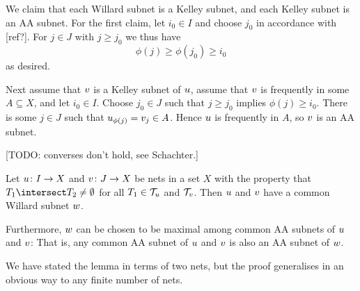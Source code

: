 \documentclass[article, a4paper, 11pt, oneside]{memoir}
\numberwithin{equation}{chapter}
\theoremstyle{nonumberplain}
\begin{document}
\begin{remarkbreak}
    We claim that each Willard subnet is a Kelley subnet, and each Kelley subnet is an AA subnet. For the first claim, let $i_0 \in I$ and choose $j_0$ in accordance with [ref?]. For $j \in J$ with $j \geq j_0$ we thus have
    \begin{equation*}
        \phi(j)
            \geq \phi(j_0)
            \geq i_0
    \end{equation*}
    as desired.

    Next assume that $v$ is a Kelley subnet of $u$, assume that $v$ is frequently in some $A \subseteq X$, and let $i_0 \in I$. Choose $j_0 \in J$ such that $j \geq j_0$ implies $\phi(j) \geq i_0$. There is some $j \in J$ such that $u_{\phi(j)} = v_j \in A$. Hence $u$ is frequently in $A$, so $v$ is an AA subnet.

    [TODO: converses don't hold, see Schachter.]
\end{remarkbreak}

\begin{lemma}
    Let $u \colon I \to X$ and $v \colon J \to X$ be nets in a set $X$ with the property that $T_1 \intersect T_2 \neq \emptyset$ for all $T_1 \in \mathcal{T}_{u}$ and $\mathcal{T}_{v}$. Then $u$ and $v$ have a common Willard subnet $w$.

    Furthermore, $w$ can be chosen to be maximal among common AA subnets of $u$ and $v$: That is, any common AA subnet of $u$ and $v$ is also an AA subnet of $w$.
\end{lemma}
%
We have stated the lemma in terms of two nets, but the proof generalises in an obvious way to any finite number of nets.
\end{document}
